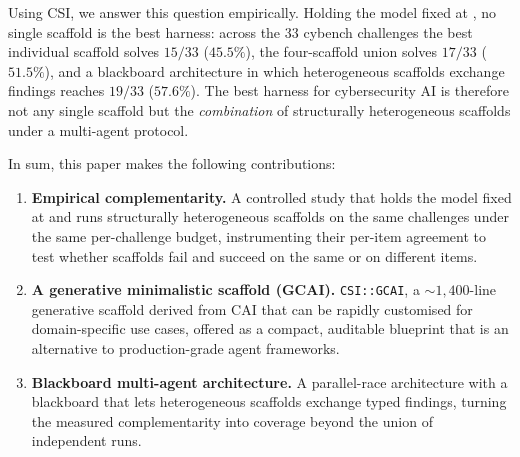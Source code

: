 Using CSI, we answer this question empirically. Holding the model fixed at \aliasmini{}, no single scaffold is the best harness: across the 33 cybench challenges the best individual scaffold solves $15/33$ ($45.5\%$), the four-scaffold union solves $17/33$ ($51.5\%$), and a blackboard architecture in which heterogeneous scaffolds exchange findings reaches $19/33$ ($57.6\%$). The best harness for cybersecurity AI is therefore not any single scaffold but the \emph{combination} of structurally heterogeneous scaffolds under a multi-agent protocol.

In sum, this paper makes the following contributions:

\begin{enumerate}[leftmargin=*,nosep]
  \item \textbf{Empirical complementarity.} A controlled study that holds the model fixed at \aliasmini{} and runs structurally heterogeneous scaffolds on the same challenges under the same per-challenge budget, instrumenting their per-item agreement to test whether scaffolds fail and succeed on the same or on different items.
  \item \textbf{A generative minimalistic scaffold (GCAI).} \texttt{CSI::GCAI}, a $\sim\!1{,}400$-line generative scaffold derived from CAI that can be rapidly customised for domain-specific use cases, offered as a compact, auditable blueprint that is an alternative to production-grade agent frameworks.
  \item \textbf{Blackboard multi-agent architecture.} A parallel-race architecture with a blackboard that lets heterogeneous scaffolds exchange typed findings, turning the measured complementarity into coverage beyond the union of independent runs.
\end{enumerate}
